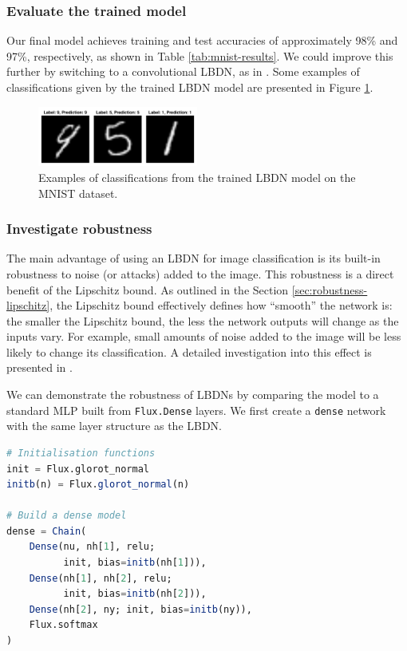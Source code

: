 \subsubsection{Evaluate the trained model} \label{sec:mnist-evaluate}

Our final model achieves training and test accuracies of approximately 98\% and 97\%, respectively, as shown in Table \ref{tab:mnist-results}. We could improve this further by switching to a convolutional LBDN, as in \cite{Wang+Manchester2023}. Some examples of classifications given by the trained LBDN model are presented in Figure \ref{fig:mnist_numbers}.

\begin{figure}[!t]
    \centering
    \includegraphics[width=0.47\textwidth]{Images/lbdn_mnist.pdf}
    \caption{Examples of classifications from the trained LBDN model on the MNIST dataset.}
    \label{fig:mnist_numbers}
\end{figure}

\subsubsection{Investigate robustness} \label{sec:mnist-robustness}

The main advantage of using an LBDN for image classification is its built-in robustness to noise (or attacks) added to the image. This robustness is a direct benefit of the Lipschitz bound. As outlined in the Section \ref{sec:robustness-lipschitz}, the Lipschitz bound effectively defines how ``smooth'' the network is: the smaller the Lipschitz bound, the less the network outputs will change as the inputs vary. For example, small amounts of noise added to the image will be less likely to change its classification. A detailed investigation into this effect is presented in \cite{Wang+Manchester2023}.

We can demonstrate the robustness of LBDNs by comparing the model to a standard MLP built from \verb|Flux.Dense| layers. We first create a \verb|dense| network with the same layer structure as the LBDN.
\begin{lstlisting}[language = Julia]
# Initialisation functions
init = Flux.glorot_normal
initb(n) = Flux.glorot_normal(n)

# Build a dense model
dense = Chain(
    Dense(nu, nh[1], relu; 
          init, bias=initb(nh[1])),
    Dense(nh[1], nh[2], relu; 
          init, bias=initb(nh[2])),
    Dense(nh[2], ny; init, bias=initb(ny)),
    Flux.softmax
)
\end{lstlisting}

